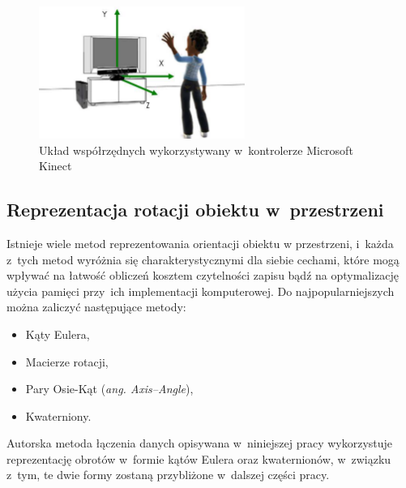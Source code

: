 \begin{savenotes}
	\begin{figure}
		\centering
		\includegraphics[width=0.6\textwidth]{images/skeletonSpace.png}
		\caption[Układ współrzędnych wykorzystywany w~kontrolerze Microsoft Kinect]{Układ współrzędnych wykorzystywany w~kontrolerze Microsoft Kinect}
		\label{fig:characteristics:kinect:space}
	\end{figure}
\end{savenotes}
																											
																									
\subsection{Reprezentacja rotacji obiektu w~przestrzeni}\label{chap:orientstionRep}
Istnieje wiele metod reprezentowania orientacji obiektu w przestrzeni, i~każda z~tych metod wyróżnia się charakterystycznymi dla siebie cechami, które mogą wpływać na łatwość obliczeń kosztem czytelności zapisu bądź na optymalizację użycia pamięci przy~ich implementacji komputerowej. Do najpopularniejszych można zaliczyć następujące metody:
																										
\begin{itemize}
	\item Kąty Eulera,
	\item Macierze rotacji,
	\item Pary Osie-Kąt (\emph{ang. Axis--Angle}),
	\item Kwaterniony.
\end{itemize} 
				
Autorska metoda łączenia danych opisywana w~niniejszej pracy wykorzystuje reprezentację obrotów w~formie kątów Eulera oraz kwaternionów, w~związku z~tym, te dwie formy zostaną przybliżone w~dalszej części pracy.
																											
